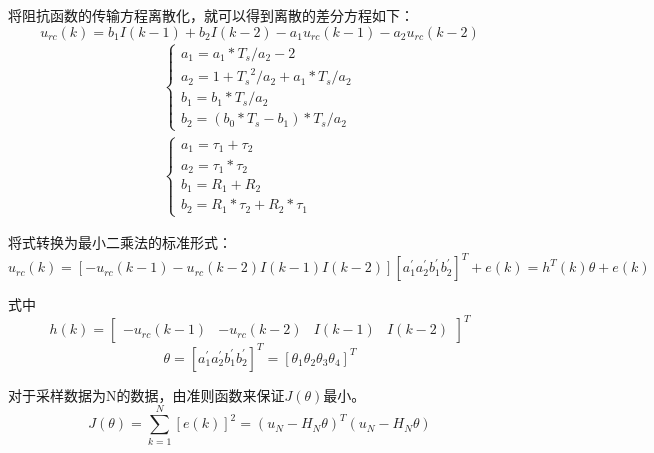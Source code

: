 将阻抗函数的传输方程离散化，就可以得到离散的差分方程如下：
\begin{equation}\label{2.7}
{u_{rc}}(k) = {b_1}I(k - 1) + {b_2}I(k - 2) - {a_1}{u_{rc}}(k - 1) - {a_2}{u_{rc}}(k - 2)
\end{equation}
\begin{equation}
\begin{array}{l}
\left\{ \begin{array}{l}
{a_1} = {a_1} * {T_s}/{a_2} - 2\\
{a_2} = 1 + {T_s}^2/{a_2} + {a_1} * {T_s}/{a_2}\\
{b_1} = {b_1} * {T_s}/{a_2}\\
{b_2} = ({b_0} * {T_s} - {b_1}) * {T_s}/{a_2}
\end{array} \right.\\
\left\{ \begin{array}{l}
{a_1} = {\tau _1} + {\tau _2}\\
{a_2} = {\tau _1} * {\tau _2}\\
{b_1} = {R_1} + {R_2}\\
{b_2} = {R_1} * {\tau _2} + {R_2} * {\tau _1}
\end{array} \right.
\end{array}
\end{equation}

将式\label{2.7}转换为最小二乘法的标准形式：
\begin{equation}
{{u}_{rc}}(k)=[-{{u}_{rc}}(k-1)-{{u}_{rc}}(k-2)I(k-1)I(k-2)]{{[a_{1}^{'}a_{2}^{'}b_{1}^{'}b_{2}^{'}]}^{T}}+e(k)={{h}^{T}}(k)\theta +e(k)
\end{equation}

式中
\begin{equation}
h(k) = {\left[ {\begin{array}{*{20}{c}}
{ - {u_{rc}}(k - 1)}&{ - {u_{rc}}(k - 2)}&{I(k - 1)}&{I(k - 2)}
\end{array}} \right]^T}
\end{equation}
\begin{equation}
\theta ={{\left[ a_{1}^{'}a_{2}^{'}b_{1}^{'}b_{2}^{'} \right]}^{T}}={{\left[ {{\theta }_{1}}{{\theta }_{2}}{{\theta }_{3}}{{\theta }_{4}} \right]}^{T}}
\end{equation}

对于采样数据为N的数据，由准则函数来保证$J\left( \theta  \right)$最小。
\begin{equation}\label{2.12}
J\left( \theta  \right) = \sum\limits_{k = 1}^N {\left[ {e(k)} \right]_{}^2}  = {\left( {{u_N} - {H_N}\theta } \right)^T}({u_N} - {H_N}\theta )
\end{equation}

